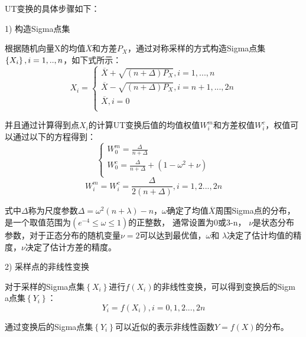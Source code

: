 UT变换的具体步骤如下：

1) 构造Sigma点集

根据随机向量X的均值$\overline{X}$和方差${{P}_{X}}$，通过对称采样的方式构造Sigma点集 $\left\{ {{X}_{i}} \right\}\\,i=1,..,n$，如下式所示：
\begin{equation}\label{3-24}
{{X}_{i}}=\left\{ \begin{array}{l}
   \overline{X}+\sqrt{(n+\Delta ){{P}_{X}}},i=1,...,n \\ 
  \overline{X}-\sqrt{(n+\Delta ){{P}_{X}}},i=n+1,...,2n \\ 
  \overline{X},i=0 \\ 
\end{array} \right.
\end{equation}  

并且通过计算得到点${{X}_{i}}$的计算UT变换后值的均值权值$W_{i}^{m}$和方差权值$W_{i}^{c}$，权值可以通过以下的方程得到：
\begin{equation}
\left\{ \begin{array}{l}
   W_{0}^{m}=\frac{\Delta }{n+\Delta } \\ 
  W_{0}^{c}=\frac{\Delta }{n+\Delta }+(1-{{\omega }^{2}}+\nu ) \\ 
\end{array} \right.
\end{equation}  
\begin{equation}
W_{i}^{m}=W_{i}^{c}=\frac{\Delta }{2\left( n+\Delta  \right)},i=1,2...,2n
\end{equation}

式中$\Delta $称为尺度参数$\Delta ={{\omega }^{2}}(n+\lambda )-n$，$\omega $确定了均值$\overline{X}$周围Sigma点的分布，是一个取值范围为$\left( {{e}^{-4}}\le \omega \le 1 \right)$的正整数， 通常设置为0或3-n， $\nu $是状态分布参数，对于正态分布的随机变量$\nu =2$可以达到最优值，$\omega $和 $\lambda $决定了估计均值的精度，$\nu $决定了估计方差的精度。

2) 采样点的非线性变换

	对于采样的Sigma点集$\left\{ {{X}_{i}} \right\}$进行$f\left( {{X}_{i}} \right)$的非线性变换，可以得到变换后的Sigm\\a点集$\left\{ {{Y}_{i}} \right\}$：
\begin{equation}
{{Y}_{i}}=f\left( {{X}_{i}} \right),i=0,1,2...,2n
\end{equation}

通过变换后的Sigma点集$\left\{ {{Y}_{i}} \right\}$可以近似的表示非线性函数$Y=f(X)$的分布。

